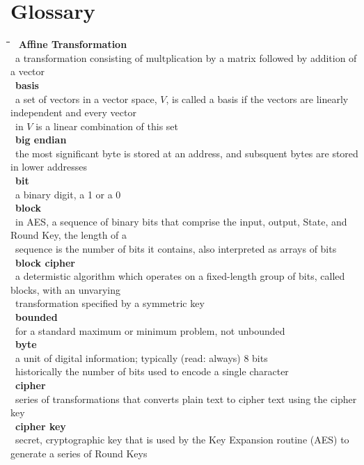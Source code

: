 \documentclass[10pt,letterpaper]{scrartcl}
\newcommand{\tbul}{\textbullet}
\newcommand{\tend}{\>\textendash}
\newcommand{\tabDef}{\hspace{2em}\=\hspace{2em}\=\hspace{2em}\=\hspace{2em}\=\kill}
\begin{document}
\newpage\section{Glossary}\begin{tabbing}\tabDef 
\tbul\ \textbf{Affine Transformation} \\
    \tend\ a transformation consisting of multplication by a matrix followed by addition of a vector \\
\tbul\ \textbf{basis} \\
    \tend\ a set of vectors in a vector space, $V$, is called a basis if the vectors are linearly independent and every vector \\ \>\ in $V$ is a linear combination of this set \\
\tbul\ \textbf{big endian} \\
    \tend\ the most significant byte is stored at an address, and subsquent bytes are stored in lower addresses\\
\tbul\ \textbf{bit} \\
    \tend\ a binary digit, a 1 or a 0 \\
\tbul\ \textbf{block} \\
    \tend\ in AES, a sequence of binary bits that comprise the input, output, State, and Round Key, the length of a \\ \>\ sequence is the number of bits it contains, also interpreted as arrays of bits \\
\tbul\ \textbf{block cipher} \\
    \tend\ a determistic algorithm which operates on a fixed-length group of bits, called blocks, with an unvarying \\ \>\ transformation specified by a symmetric key \\
\tbul\ \textbf{bounded} \\
    \tend\ for a standard maximum or minimum problem, not unbounded \\
\tbul\ \textbf{byte} \\
    \tend\ a unit of digital information; typically (read: always) 8 bits \\
    \tend\ historically the number of bits used to encode a single character \\
\tbul\ \textbf{cipher} \\
    \tend\ series of transformations that converts plain text to cipher text using the cipher key \\
\tbul\ \textbf{cipher key} \\ 
    \tend\ secret, cryptographic key that is used by the Key Expansion routine (AES) to generate a series of Round Keys \\

\end{tabbing}
\end{document}
